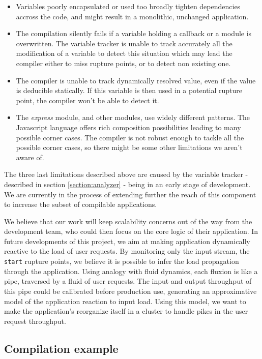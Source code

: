 \begin{itemize}
  \item Variables poorly encapsulated or used too broadly tighten dependencies accross the code, and might result in a monolithic, unchanged application.
  \item The compilation silently fails if a variable holding a callback or a module is overwritten.
        The variable tracker is unable to track accurately all the modification of a variable to detect this situation which may lead the compiler either to miss rupture points, or to detect non existing one.
  \item The compiler is unable to track dynamically resolved value, even if the value is deducible statically.
        If this variable is then used in a potential rupture point, the compiler won't be able to detect it.
  \item The \textit{express} module, and other modules, use widely different patterns.
        The Javascript language offers rich composition possibilities leading to many possible corner cases.
        The compiler is not robust enough to tackle all the possible corner cases, so there might be some other limitations we aren't aware of.
\end{itemize}

The three last limitations described above are caused by the variable tracker - described in section \ref{section:analyzer} - being in an early stage of development.
We are currently in the process of extending further the reach of this component to increase the subset of compilable applications.

We believe that our work will keep scalability concerns out of the way from the development team, who could then focus on the core logic of their application.
In future developments of this project, we aim at making application dynamically reactive to the load of user requests.
By monitoring only the input stream, the \texttt{start} rupture points, we believe it is possible to infer the load propagation through the application.
Using analogy with fluid dynamics, each fluxion is like a pipe, traversed by a fluid of user requests.
The input and output throughput of this pipe could be calibrated before production use, generating an approximative model of the application reaction to input load.
Using this model, we want to make the application's reorganize itself in a cluster to handle pikes in the user request throughput.

\subsection{Compilation example}

